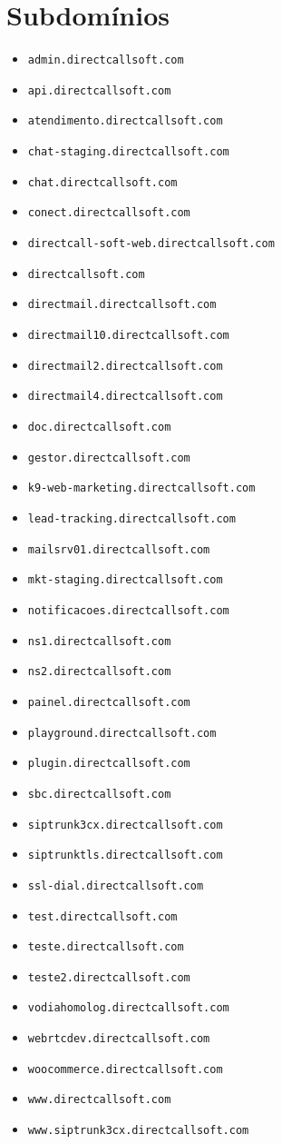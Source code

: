 
\section{Subdomínios}
\begin{multicols}{2}  %
\begin{itemize}
\item \texttt{admin.directcallsoft.com}\item \texttt{api.directcallsoft.com}\item \texttt{atendimento.directcallsoft.com}\item \texttt{chat-staging.directcallsoft.com}\item \texttt{chat.directcallsoft.com}\item \texttt{conect.directcallsoft.com}\item \texttt{directcall-soft-web.directcallsoft.com}\item \texttt{directcallsoft.com}\item \texttt{directmail.directcallsoft.com}\item \texttt{directmail10.directcallsoft.com}\item \texttt{directmail2.directcallsoft.com}\item \texttt{directmail4.directcallsoft.com}\item \texttt{doc.directcallsoft.com}\item \texttt{gestor.directcallsoft.com}\item \texttt{k9-web-marketing.directcallsoft.com}\item \texttt{lead-tracking.directcallsoft.com}\item \texttt{mailsrv01.directcallsoft.com}\item \texttt{mkt-staging.directcallsoft.com}\item \texttt{notificacoes.directcallsoft.com}\item \texttt{ns1.directcallsoft.com}\item \texttt{ns2.directcallsoft.com}\item \texttt{painel.directcallsoft.com}\item \texttt{playground.directcallsoft.com}\item \texttt{plugin.directcallsoft.com}\item \texttt{sbc.directcallsoft.com}\item \texttt{siptrunk3cx.directcallsoft.com}\item \texttt{siptrunktls.directcallsoft.com}\item \texttt{ssl-dial.directcallsoft.com}\item \texttt{test.directcallsoft.com}\item \texttt{teste.directcallsoft.com}\item \texttt{teste2.directcallsoft.com}\item \texttt{vodiahomolog.directcallsoft.com}\item \texttt{webrtcdev.directcallsoft.com}\item \texttt{woocommerce.directcallsoft.com}\item \texttt{www.directcallsoft.com}\item \texttt{www.siptrunk3cx.directcallsoft.com}
\end{itemize}
\end{multicols}
